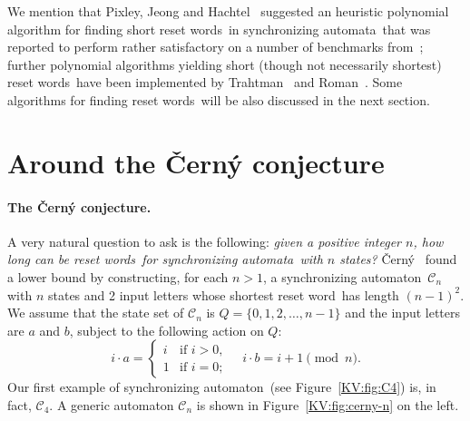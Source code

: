 \documentclass{irmaart}
\newcommand{\sa}{synchronizing au\-tom\-a\-ta}
\newcommand{\san}{synchronizing au\-tom\-a\-ton}
\newcommand{\sw}{reset word}
\newcommand{\sws}{reset words}
\theoremstyle{plain}
\begin{document}
We mention that Pixley, Jeong and Hachtel~\cite{Pixley&Jeong&Hachtel:1992}
suggested an heuristic polynomial algorithm for finding short \sws\ in \sa\
that was reported to perform rather satisfactory on a number of benchmarks
from~\cite{Yang:1991}; further polynomial algorithms yielding short (though not
necessarily shortest) \sws\ have been implemented by
Trahtman~\cite{Trahtman:2006} and Roman~\cite{Roman:2009a,Roman:2009}. Some
algorithms for finding \sws\ will be also discussed in the next section.

\section{Around the \v{C}ern\'{y} conjecture}
\label{KV:sec:Cerny conjecture}
\paragraph*{The \v{C}ern\'{y} conjecture.} A very natural question to ask
is the following: \emph{given a positive integer $n$, how long can be \sws\ for
\sa\ with $n$ states?} \v{C}ern\'{y}~\cite{Cerny:1964} found a lower bound by
constructing, for each $n>1$, a \san\
$\mathcal{C}_n$ with $n$ states and 2 input
letters whose shortest \sw\ has length $(n-1)^2$. We assume that the state set
of $\mathcal{C}_n$ is $Q=\{0,1,2,\dots,n-1\}$ and the input letters are $a$ and
$b$, subject to the following action on $Q$:
\begin{displaymath}
i\cdot a=\begin{cases}
i &\text{if } i>0,\\
1 &\text{if } i=0;
\end{cases}\quad
i\cdot b=i+1\!\!\pmod{n}.
\end{displaymath}
Our first example of \san\ (see Figure~\ref{KV:fig:C4}) is, in fact,
$\mathcal{C}_4$. A generic automaton $\mathcal{C}_n$ is shown in
Figure~\ref{KV:fig:cerny-n} on the left.
\end{document}
